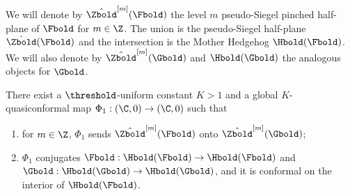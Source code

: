\documentclass{amsart}
\begin{document}
We will denote by $\hat{\Zbold}^{[m]}(\Fbold)$ the level $m$ pseudo-Siegel pinched half-plane of $\Fbold$ for $m \in \Z$. 
The union is the pseudo-Siegel half-plane $\hat{\Zbold}(\Fbold)$ and the intersection is the Mother Hedgehog $\Hbold(\Fbold)$.
We will also denote by $\hat{\Zbold}^{[m]}(\Gbold)$ and $\Hbold(\Gbold)$ the analogous objects for $\Gbold$.

\begin{lemma}
\label{lem:qc-thurston-equivalence-02}
    There exist a $\threshold$-uniform constant $K>1$ and a global $K$-quasiconformal map $\Phi_1: (\C,0) \to (\C,0)$ such that
    \begin{enumerate}
        \item for $m \in \Z$, $\Phi_1$ sends $\hat{\Zbold}^{[m]}(\Fbold)$ onto $\hat{\Zbold}^{[m]}(\Gbold)$;
        \item $\Phi_1$ conjugates $\Fbold : \Hbold(\Fbold) \to \Hbold(\Fbold)$ and $\Gbold : \Hbold(\Gbold) \to \Hbold(\Gbold)$, and it is conformal on the interior of $\Hbold(\Fbold)$.
    \end{enumerate}
\end{lemma}
\end{document}
